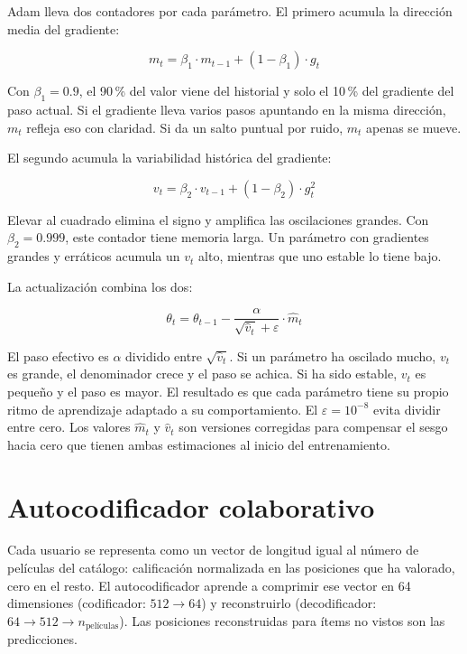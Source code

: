 Adam lleva dos contadores por cada parámetro. El primero acumula la dirección media del gradiente:

\begin{equation}
    m_t = \beta_1 \cdot m_{t-1} + (1 - \beta_1) \cdot g_t
\end{equation}

Con $\beta_1 = 0.9$, el 90\,\% del valor viene del historial y solo el 10\,\% del gradiente del paso actual. Si el gradiente lleva varios pasos apuntando en la misma dirección, $m_t$ refleja eso con claridad. Si da un salto puntual por ruido, $m_t$ apenas se mueve.

El segundo acumula la variabilidad histórica del gradiente:

\begin{equation}
    v_t = \beta_2 \cdot v_{t-1} + (1 - \beta_2) \cdot g_t^2
\end{equation}

Elevar al cuadrado elimina el signo y amplifica las oscilaciones grandes. Con $\beta_2 = 0.999$, este contador tiene memoria larga. Un parámetro con gradientes grandes y erráticos acumula un $v_t$ alto, mientras que uno estable lo tiene bajo.

La actualización combina los dos:

\begin{equation}
    \theta_t = \theta_{t-1} - \frac{\alpha}{\sqrt{\hat{v}_t} + \varepsilon} \cdot \hat{m}_t
\end{equation}

El paso efectivo es $\alpha$ dividido entre $\sqrt{\hat{v}_t}$. Si un parámetro ha oscilado mucho, $v_t$ es grande, el denominador crece y el paso se achica. Si ha sido estable, $v_t$ es pequeño y el paso es mayor. El resultado es que cada parámetro tiene su propio ritmo de aprendizaje adaptado a su comportamiento. El $\varepsilon = 10^{-8}$ evita dividir entre cero. Los valores $\hat{m}_t$ y $\hat{v}_t$ son versiones corregidas para compensar el sesgo hacia cero que tienen ambas estimaciones al inicio del entrenamiento.

\section{Autocodificador colaborativo}

Cada usuario se representa como un vector de longitud igual al número de películas del catálogo: calificación normalizada en las posiciones que ha valorado, cero en el resto. El autocodificador aprende a comprimir ese vector en 64 dimensiones (codificador: $512 \to 64$) y reconstruirlo (decodificador: $64 \to 512 \to n_\text{películas}$). Las posiciones reconstruidas para ítems no vistos son las predicciones.

